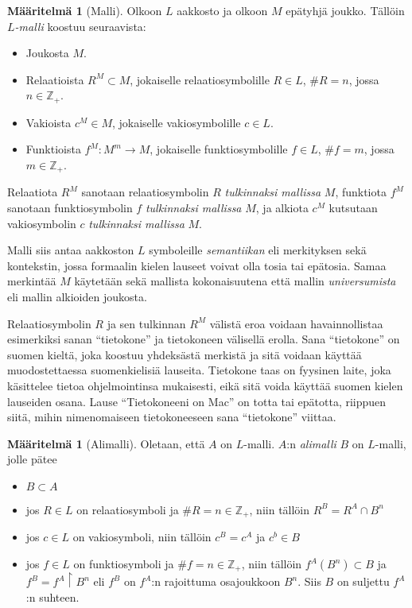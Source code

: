 \documentclass[finnish]{tktltiki2}
\theoremstyle{definition}
\newtheorem{maar}[lau]{Määritelmä}
\theoremstyle{remark}
\begin{document}
\begin{maar}[Malli] Olkoon $L$ aakkosto ja olkoon $M$ epätyhjä joukko. Tällöin $L$\textit{-malli} koostuu seuraavista:
\begin{itemize}
\item Joukosta $M$.
\item Relaatioista $R^M \subset M$, jokaiselle relaatiosymbolille $R \in L$, $\#R = n$, jossa $n\in \mathbb{Z}_+$.
\item Vakioista $c^M \in M$, jokaiselle vakiosymbolille $c \in L$.
\item Funktioista $f^M: M^m \rightarrow M$, jokaiselle funktiosymbolille $f \in L$, $\#f = m$, jossa $m\in \mathbb{Z}_+$.
\end{itemize}

Relaatiota $R^M$ sanotaan relaatiosymbolin $R$ \textit{tulkinnaksi mallissa} $M$, funktiota $f^M$ sanotaan funktiosymbolin $f$ \textit{tulkinnaksi mallissa} $M$, ja alkiota $c^M$ kutsutaan vakiosymbolin $c$ \textit{tulkinnaksi mallissa} $M$.
\end{maar}

Malli siis antaa aakkoston $L$ symboleille \textit{semantiikan} eli merkityksen sekä kontekstin, jossa formaalin kielen lauseet voivat olla tosia tai epätosia. Samaa merkintää $M$ käytetään sekä mallista kokonaisuutena että mallin \textit{universumista} eli mallin alkioiden joukosta.

Relaatiosymbolin $R$ ja sen tulkinnan $R^M$ välistä eroa voidaan havainnollistaa esimerkiksi sanan ``tietokone'' ja tietokoneen välisellä erolla. Sana ``tietokone'' on suomen kieltä, joka koostuu yhdeksästä merkistä ja sitä voidaan käyttää muodostettaessa suomenkielisiä lauseita. Tietokone taas on fyysinen laite, joka käsittelee tietoa ohjelmointinsa mukaisesti, eikä sitä voida käyttää suomen kielen lauseiden osana. Lause ``Tietokoneeni on Mac'' on totta tai epätotta, riippuen siitä, mihin nimenomaiseen tietokoneeseen sana ``tietokone'' viittaa.

\begin{maar}[Alimalli]
Oletaan, että $A$ on $L$-malli. $A$:n \textit{alimalli} $B$ on $L$-malli, jolle pätee
\begin{itemize}
\item $B \subset A$
\item jos $R \in L$ on relaatiosymboli ja $\#R = n \in \mathbb{Z}_+$, niin tällöin $R^B = R^A \cap B^n$
\item jos $c \in L$ on vakiosymboli, niin tällöin $c^B = c^A$ ja $c^b \in B$
\item jos $f \in L$ on funktiosymboli ja $\#f = n \in \mathbb{Z}_+$, niin tällöin $f^A(B^n) \subset B$ ja $f^B = f^A \restriction B^n$ eli $f^B$ on $f^A$:n rajoittuma osajoukkoon $B^n$. Siis $B$ on suljettu $f^A$:n suhteen.
\end{itemize}
\end{maar}
\end{document}
